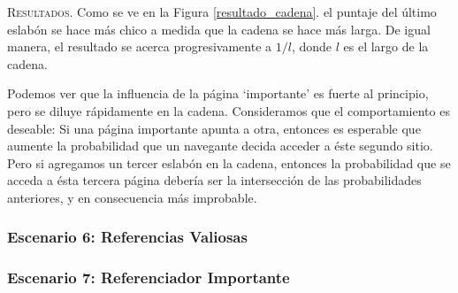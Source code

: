 \vspace{1em}
\noindent \textsc{Resultados}. Como se ve en la Figura \ref{resultado_cadena}. el puntaje del último eslabón se hace más chico a medida que la cadena se hace más larga. De igual manera, el resultado se acerca progresivamente a $1/l$, donde $l$ es el largo de la cadena. 

\vspace{1em}
Podemos ver que la influencia de la página `importante' es fuerte al principio, pero se diluye rápidamente en la cadena. Consideramos que el comportamiento es deseable: Si una página importante apunta a otra, entonces es esperable que aumente la probabilidad que un navegante decida acceder a éste segundo sitio. Pero si agregamos un tercer eslabón en la cadena, entonces la probabilidad que se acceda a ésta tercera página debería ser la intersección de las probabilidades anteriores, y en consecuencia más improbable. 


\vspace{2em}
\subsubsection{Escenario 6: Referencias Valiosas}


\vspace{2em}
\subsubsection{Escenario 7: Referenciador Importante}